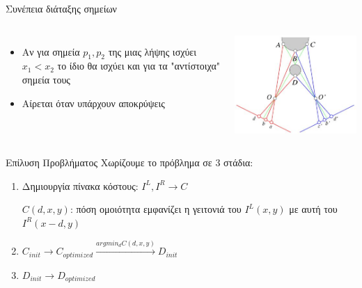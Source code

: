 \documentclass[english,greek]{beamer}
\begin{document}
\begin{frame}{Συνέπεια διάταξης σημείων}
	\begin{columns}[onlytextwidth]
		\begin{itemize}
			\item Αν για σημεία $p_1,p_2$ της μιας λήψης ισχύει $x_1<x_2$ το ίδιο θα ισχύει και για τα "αντίστοιχα" σημεία τους 
			\item Αίρεται όταν υπάρχουν αποκρύψεις
		\end{itemize}
		\includegraphics[width=\textwidth]{ordering_constraint_failure.png}
	\end{columns}
\end{frame}

\begin{frame}{Επίλυση Προβλήματος}
Χωρίζουμε το πρόβλημα σε 3 στάδια:
\begin{enumerate}
	\item Δημιουργία πίνακα κόστους: $I^L,I^R\rightarrow C$
	
	$C(d,x,y)$: πόση ομοιότητα εμφανίζει η γειτονιά του $I^L(x,y)$ με αυτή του $I^R(x-d,y)$
	\item $C_{init} \rightarrow C_{optimized} \xrightarrow{argmin_d C(d,x,y)} D_{init}$
	\item $D_{init} \rightarrow D_{optimized}$
\end{enumerate}
\end{frame}
\end{document}
